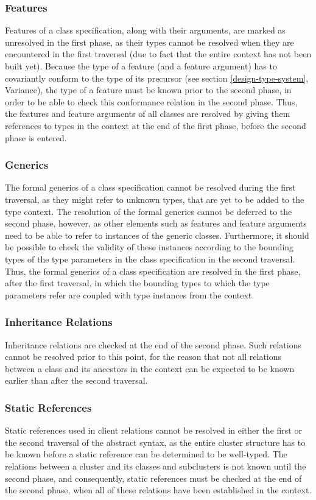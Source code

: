 \subsubsection{Features} %
Features of a class specification, along with their arguments, are marked as unresolved in the first phase, as their types cannot be resolved when they are encountered in the first traversal (due to fact that the entire context has not been built yet). Because the type of a feature (and a feature argument) has to covariantly conform to the type of its precursor (see section \ref{design-type-system}, Variance), the type of a feature must be known prior to the second phase, in order to be able to check this conformance relation in the second phase. Thus, the features and feature arguments of all classes are resolved by giving them references to types in the context at the end of the first phase, before the second phase is entered.
\subsubsection{Generics} %
The formal generics 	of a class specification cannot be resolved during the first traversal, as they might refer to unknown types, that are yet to be added to the type context. The resolution of the formal generics cannot be deferred to the second phase, however, as other elements such as features and feature arguments need to be able to refer to instances of the generic classes. Furthermore, it should be possible to check the validity of these instances according to the bounding types of the type parameters in the class specification in the second traversal. Thus, the formal generics of a class specification are resolved in the first phase, after the first traversal, in which the bounding types to which the type parameters refer are coupled with type instances from the context.
\subsubsection{Inheritance Relations} %
Inheritance relations are checked at the end of the second phase. Such relations cannot be resolved prior to this point, for the reason that not all relations between a class and its ancestors in the context can be expected to be known earlier than after the second traversal.
\subsubsection{Static References} %
Static references used in client relations cannot be resolved in either the first or the second traversal of the abstract syntax, as the entire cluster structure has to be known before a static reference can be determined to be well-typed. The relations between a cluster and its classes and subclusters is not known until the second phase, and consequently, static references must be checked at the end of the second phase, when all of these relations have been established in the context.
